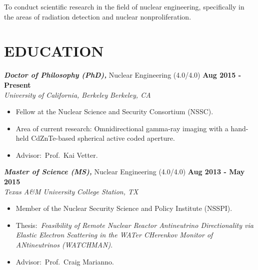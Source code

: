 \documentclass[margin, 10pt]{style/res} %
\begin{document}
\begin{resume}
To conduct scientific research in the field of nuclear engineering, specifically in the areas of radiation detection and nuclear nonproliferation.





\section{\small{EDUCATION}}

{\sl\bf Doctor of Philosophy (PhD),} Nuclear Engineering (4.0/4.0) \hfill {\bf Aug 2015 - Present}\\
{\sl University of California, Berkeley} \hfill {\sl Berkeley, CA}
\vspace{2.5pt}
\begin{itemize}[leftmargin=4ex] \itemsep -2pt %
\item Fellow at the Nuclear Science and Security Consortium (NSSC).
\item Area of current research: Omnidirectional gamma-ray imaging with a hand-held CdZnTe-based spherical active coded aperture.
\item Advisor:~Prof.~Kai Vetter.
\end{itemize}

{\sl\bf Master of Science (MS),} Nuclear Engineering (4.0/4.0) \hfill {\bf Aug 2013 - May 2015}\\
{\sl Texas A\&M University} \hfill {\sl College Station, TX}
\vspace{2.5pt}
\begin{itemize}[leftmargin=4ex] \itemsep -2pt %
\item Member of the Nuclear Security Science and Policy Institute (NSSPI).
\item Thesis:~\emph{Feasibility of Remote Nuclear Reactor Antineutrino Directionality via Elastic Electron Scattering in the WATer CHerenkov Monitor of ANtineutrinos (WATCHMAN)}.
\item Advisor:~Prof.~Craig Marianno.
\end{itemize}


\end{resume}
\end{document}
